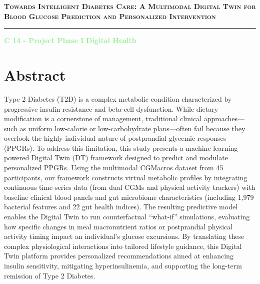 \documentclass[12pt]{article}
\begin{document}
\begin{center}
    \Large \textsc{\textbf{Towards Intelligent Diabetes Care: A Multimodal Digital Twin for Blood Glucose Prediction and Personalized Intervention}}
\end{center}
\vspace{-0.2cm}
\noindent\rule{\textwidth}{0.8pt}
\vspace{0.1cm}
\noindent\textcolor{lightgreen}{\textbf{C 14 - Project Phase I}} \hfill \textcolor{lightgreen}{\textbf{Digital Health}}
\vspace{0.8cm}

\section*{Abstract}
Type 2 Diabetes (T2D) is a complex metabolic condition characterized by progressive insulin resistance and beta-cell dysfunction. While dietary modification is a cornerstone of management, traditional clinical approaches---such as uniform low-calorie or low-carbohydrate plans---often fail because they overlook the highly individual nature of postprandial glycemic responses (PPGRs). To address this limitation, this study presents a machine-learning-powered Digital Twin (DT) framework designed to predict and modulate personalized PPGRs. Using the multimodal CGMacros dataset from 45 participants, our framework constructs virtual metabolic profiles by integrating continuous time-series data (from dual CGMs and physical activity trackers) with baseline clinical blood panels and gut microbiome characteristics (including 1,979 bacterial features and 22 gut health indices). The resulting predictive model enables the Digital Twin to run counterfactual ``what-if'' simulations, evaluating how specific changes in meal macronutrient ratios or postprandial physical activity timing impact an individual's glucose excursions. By translating these complex physiological interactions into tailored lifestyle guidance, this Digital Twin platform provides personalized recommendations aimed at enhancing insulin sensitivity, mitigating hyperinsulinemia, and supporting the long-term remission of Type 2 Diabetes.

\vspace{0.5cm}
\end{document}
